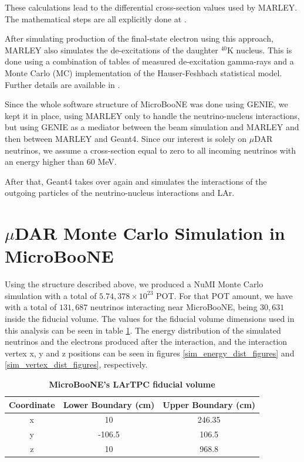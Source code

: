These calculations lead to the differential cross-section values used by MARLEY. The mathematical steps are all explicitly done at \cite{Gardiner_thesis}. 

After simulating production of the final-state electron using this approach, MARLEY also simulates the de-excitations of the daughter $^{40}$K nucleus. This is done using a combination of tables of measured de-excitation gamma-rays and a Monte Carlo (MC) implementation of the Hauser-Feshbach statistical model. Further details are available in \cite{deexcitation-model}. 

Since the whole software structure of MicroBooNE was done using GENIE, we kept it in place, using MARLEY only to handle the neutrino-nucleus interactions, but using GENIE as a mediator between the beam simulation and MARLEY and then between MARLEY and Geant4. Since our interest is solely on $\mu$DAR neutrinos, we assume a cross-section equal to zero to all incoming neutrinos with an energy higher than $60$ MeV. 

After that, Geant4 takes over again and simulates the interactions of the outgoing particles of the neutrino-nucleus interactions and LAr. 

\section{$\mu$DAR Monte Carlo Simulation in MicroBooNE}

Using the structure described above, we produced a NuMI Monte Carlo simulation with a total of $5.74,378 \times 10^{23}$ POT. For that POT amount, we have with a total of $131,687$ neutrinos interacting near MicroBooNE, being $30,631$ inside the fiducial volume. The values for the fiducial volume dimensions used in this analysis can be seen in table \ref{fiducial}. The energy distribution of the simulated neutrinos and the electrons produced after the interaction, and the interaction vertex x, y and z positions can be seen in figures \ref{sim_energy_dist_figures} and \ref{sim_vertex_dist_figures}, respectively.  

\begin{table}
	\begin{center}
		\begin{tabular}{ccc}
			\bottomrule
						 \textbf{Coordinate}	&	\textbf{Lower Boundary (cm)}	&	\textbf{Upper Boundary (cm)}\\
			\toprule
			x &	10 & 246.35 \\ 
			y &	-106.5 & 106.5 \\
			z &	10 & 968.8 \\ 
			\toprule
		\end{tabular}
		\caption[MicroBooNE's LArTPC fiducial volume]{{\textbf{MicroBooNE's LArTPC fiducial volume}}}
		\label{fiducial}
	\end{center}
\end{table}

